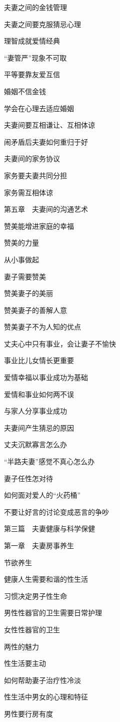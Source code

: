 \documentclass[12pt,UTF8]{ctexbook}
\begin{document}
夫妻之间的金钱管理

夫妻之间要克服猜忌心理

理智成就爱情经典

“妻管严”现象不可取

平等要靠友爱互信

婚姻不信金钱

学会在心理去适应婚姻

夫妻间要互相谦让、互相体谅

闹矛盾后夫妻如何重归于好

夫妻间的家务协议

家务要夫妻共同分担

家务需互相体谅

第五章　夫妻间的沟通艺术

赞美能增进家庭的幸福

赞美的力量

从小事做起

妻子需要赞美

赞美妻子的美丽

赞美妻子的善解人意

赞美妻子不为人知的优点

丈夫心中只有事业，会让妻子不愉快

事业比儿女情长更重要

爱情幸福以事业成功为基础

爱情和事业如何两不误

与家人分享事业成功

夫妻间产生猜忌的原因

丈夫沉默寡言怎么办

“半路夫妻”感觉不真心怎么办

妻子任性怎对待

如何面对爱人的“火药桶”

不要让好言的讨论变成恶言的争吵

第三篇　夫妻健康与科学保健

第一章　夫妻房事养生

节欲养生

健康人生需要和谐的性生活

习惯决定男子性生命

男性性器官的卫生需要日常护理

女性性器官的卫生

两性的魅力

性生活要主动

如何帮助妻子治疗性冷淡

性生活中男女的心理和特征

男性要行房有度
\end{document}
